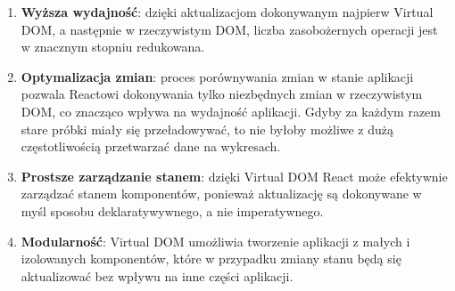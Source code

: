 \begin{enumerate}
    \item \textbf{Wyższa wydajność}: dzięki aktualizacjom dokonywanym najpierw Virtual DOM, a następnie w rzeczywistym DOM, liczba zasobożernych operacji jest w znacznym stopniu redukowana.
    \item \textbf{Optymalizacja zmian}: proces porównywania zmian w stanie aplikacji pozwala Reactowi dokonywania tylko niezbędnych zmian w rzeczywistym DOM, co znacząco wpływa na wydajność aplikacji. Gdyby za każdym razem stare próbki miały się przeładowywać, to nie byłoby możliwe z dużą częstotliwością przetwarzać dane na wykresach.
    \item \textbf{Prostsze zarządzanie stanem}: dzięki Virtual DOM React może efektywnie zarządzać stanem komponentów, ponieważ aktualizację są dokonywane w myśl sposobu deklaratywywnego, a nie imperatywnego.
    \item \textbf{Modularność}: Virtual DOM umożliwia tworzenie aplikacji z małych i izolowanych komponentów, które w przypadku zmiany stanu będą się aktualizować bez wpływu na inne części aplikacji.
\end{enumerate}
